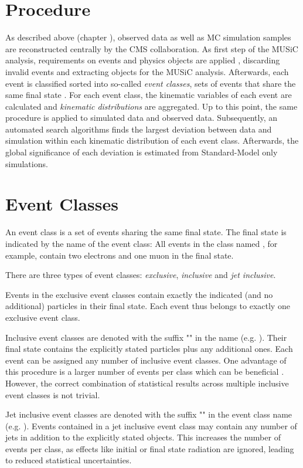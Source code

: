 \section{Procedure}
As described above (chapter ), observed data as well as \ac{MC} simulation samples are reconstructed centrally by the \ac{CMS} collaboration. 
As first step of the \ac{MUSiC} analysis, requirements on events and physics objects are applied , discarding invalid events and extracting objects for the \ac{MUSiC} analysis.
Afterwards, each event is classified sorted into so-called \emph{event classes}, sets of events that share the same final state .
For each event class, the kinematic variables of each event are calculated and \emph{kinematic distributions} are aggregated.
Up to this point, the same procedure is applied to simulated data and observed data.
Subsequently, an automated search algorithms finds the largest deviation between data and simulation within each kinematic distribution of each event class. Afterwards, the global significance of each deviation is estimated from Standard-Model only simulations.

\section{Event Classes}
An event class is a set of events sharing the same final state. The final state is indicated by the name of the event class: All events in the class named \eventclass{2\Pe + 1\Pmu}, for example, contain two electrons and one muon in the final state.

There are three types of event classes: \emph{exclusive}, \emph{inclusive} and \emph{jet inclusive}.

Events in the exclusive event classes contain exactly the indicated (and no additional) particles in their final state. Each event thus belongs to exactly one exclusive event class.

Inclusive event classes are denoted with the suffix "" in the name (e.g. ). Their final state contains the explicitly stated particles plus any additional ones. Each event can be assigned any number of inclusive event classes. One advantage of this procedure is a larger number of events per class which can be beneficial . However, the correct combination of statistical results across multiple inclusive event classes is not trivial.

Jet inclusive event classes are denoted with the suffix "" in the event class name (e.g. ). Events contained in a jet inclusive event class may contain any number of jets in addition to the explicitly stated objects. This increases the number of events per class, as effects like initial or final state radiation are ignored, leading to reduced statistical uncertainties.

